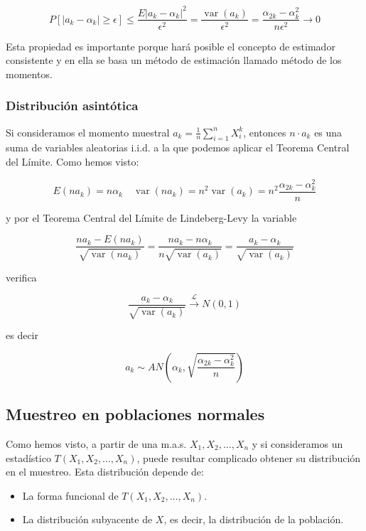 \documentclass[
]{article}
\providecommand{\tightlist}{%
  \setlength{\itemsep}{0pt}\setlength{\parskip}{0pt}}
\begin{document}
\[
P\left[\left|a_{k}-\alpha_{k}\right| \geq \epsilon\right] \leq \frac{E\left|a_{k}-\alpha_{k}\right|^{2}}{\epsilon^{2}}=\frac{\operatorname{var}\left(a_{k}\right)}{\epsilon^{2}}=\frac{\alpha_{2 k}-\alpha_{k}^{2}}{n \epsilon^{2}} \longrightarrow 0
\]

Esta propiedad es importante porque hará posible el concepto de estimador consistente y en ella se basa un método de estimación llamado método de los momentos.

\subsubsection{Distribución asintótica}\label{distribuciuxf3n-asintuxf3tica}

Si consideramos el momento muestral \(a_{k}=\frac{1}{n} \sum_{i=1}^{n} X_{i}^{k}\), entonces \(n \cdot a_{k}\) es una suma de variables aleatorias i.i.d. a la que podemos aplicar el Teorema Central del Límite. Como hemos visto:

\[
E\left(n a_{k}\right)=n \alpha_{k} \quad \operatorname{var}\left(n a_{k}\right)=n^{2} \operatorname{var}\left(a_{k}\right)=n^{2} \frac{\alpha_{2 k}-\alpha_{k}^{2}}{n}
\]

y por el Teorema Central del Límite de Lindeberg-Levy la variable

\[
\frac{n a_{k}-E\left(n a_{k}\right)}{\sqrt{\operatorname{var}\left(n a_{k}\right)}}=\frac{n a_{k}-n \alpha_{k}}{n \sqrt{\operatorname{var}\left(a_{k}\right)}}=\frac{a_{k}-\alpha_{k}}{\sqrt{\operatorname{var}\left(a_{k}\right)}}
\]

verifica

\[
\frac{a_{k}-\alpha_{k}}{\sqrt{\operatorname{var}\left(a_{k}\right)}} \xrightarrow{\mathcal{L}} N(0,1)
\]

es decir

\[
a_{k} \sim A N\left(\alpha_{k}, \sqrt{\frac{\alpha_{2 k}-\alpha_{k}^{2}}{n}}\right)
\]

\subsection{Muestreo en poblaciones normales}\label{muestreo-en-poblaciones-normales}

Como hemos visto, a partir de una m.a.s. \(X_{1}, X_{2}, \ldots, X_{n}\) y si consideramos un estadístico \(T\left(X_{1}, X_{2}, \ldots, X_{n}\right)\), puede resultar complicado obtener su distribución en el muestreo. Esta distribución depende de:

\begin{itemize}
\tightlist
\item
  La forma funcional de \(T\left(X_{1}, X_{2}, \ldots, X_{n}\right)\).
\item
  La distribución subyacente de \(X\), es decir, la distribución de la población.
\end{itemize}
\end{document}
